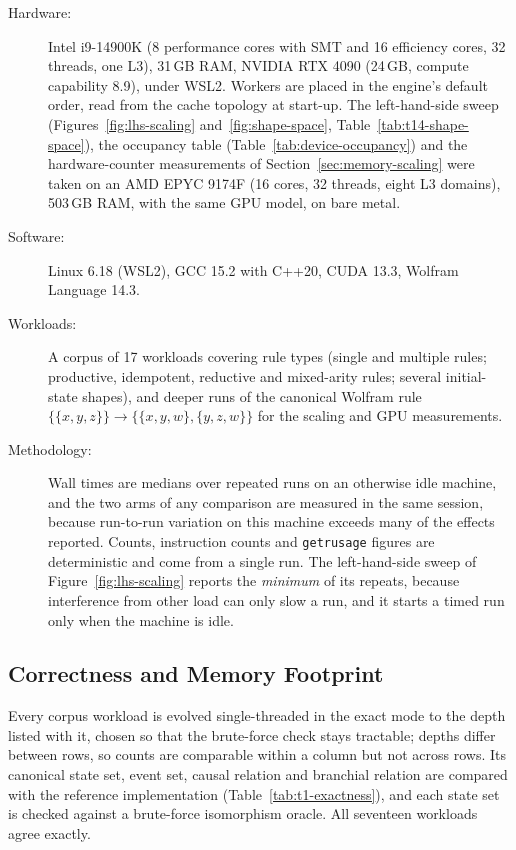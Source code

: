\begin{description}
\item[Hardware:] Intel i9-14900K (8 performance cores with SMT and 16 efficiency cores, 32 threads, one L3), 31\,GB RAM, NVIDIA RTX 4090 (24\,GB, compute capability 8.9), under WSL2. Workers are placed in the engine's default order, read from the cache topology at start-up. The left-hand-side sweep (Figures~\ref{fig:lhs-scaling} and~\ref{fig:shape-space}, Table~\ref{tab:t14-shape-space}), the occupancy table (Table~\ref{tab:device-occupancy}) and the hardware-counter measurements of Section~\ref{sec:memory-scaling} were taken on an AMD EPYC 9174F (16 cores, 32 threads, eight L3 domains), 503\,GB RAM, with the same GPU model, on bare metal.
\item[Software:] Linux 6.18 (WSL2), GCC 15.2 with C++20, CUDA 13.3, Wolfram Language 14.3.
\item[Workloads:] A corpus of 17 workloads covering rule types (single and multiple rules; productive, idempotent, reductive and mixed-arity rules; several initial-state shapes), and deeper runs of the canonical Wolfram rule $\{\{x,y,z\}\} \to \{\{x,y,w\},\{y,z,w\}\}$ for the scaling and GPU measurements.
\item[Methodology:] Wall times are medians over repeated runs on an otherwise idle machine, and the two arms of any comparison are measured in the same session, because run-to-run variation on this machine exceeds many of the effects reported. Counts, instruction counts and \texttt{getrusage} figures are deterministic and come from a single run. The left-hand-side sweep of Figure~\ref{fig:lhs-scaling} reports the \emph{minimum} of its repeats, because interference from other load can only slow a run, and it starts a timed run only when the machine is idle.
\end{description}

\subsection{Correctness and Memory Footprint}
Every corpus workload is evolved single-threaded in the exact mode to the depth listed with it,
chosen so that the brute-force check stays tractable; depths differ between rows, so counts are
comparable within a column but not across rows. Its canonical state set, event set, causal
relation and branchial relation are compared with the reference implementation
(Table~\ref{tab:t1-exactness}), and each state set is checked against a brute-force isomorphism
oracle. All seventeen workloads agree exactly.

